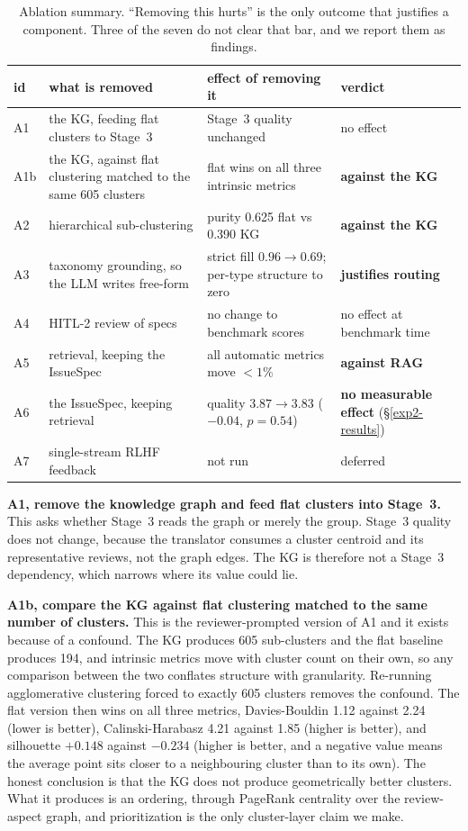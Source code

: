 \documentclass[sigconf, anonymous]{acmart}
\begin{document}
\begin{table}[t]\centering\footnotesize
\caption{Ablation summary. ``Removing this hurts'' is the only outcome that justifies a
component. Three of the seven do not clear that bar, and we report them as findings.}\label{tab:ablation-summary}
\begin{tabular}{@{}p{0.9cm}p{3.6cm}p{3.6cm}p{2.3cm}@{}}\toprule
id & what is removed & effect of removing it & verdict \\\midrule
A1 & the KG, feeding flat clusters to Stage~3 & Stage~3 quality unchanged & no effect \\
A1b & the KG, against flat clustering matched to the same 605 clusters & flat wins on all three intrinsic metrics & \textbf{against the KG} \\
A2 & hierarchical sub-clustering & purity 0.625 flat vs 0.390 KG & \textbf{against the KG} \\
A3 & taxonomy grounding, so the LLM writes free-form & strict fill $0.96 \to 0.69$; per-type structure to zero & \textbf{justifies routing} \\
A4 & HITL-2 review of specs & no change to benchmark scores & no effect at benchmark time \\
A5 & retrieval, keeping the IssueSpec & all automatic metrics move $<1\%$ & \textbf{against RAG} \\
A6 & the IssueSpec, keeping retrieval & quality $3.87 \to 3.83$ ($-0.04$, $p=0.54$) & \textbf{no measurable effect} (\S\ref{exp2-results}) \\
A7 & single-stream RLHF feedback & not run & deferred \\
\bottomrule\end{tabular}\end{table}

  \textbf{A1, remove the knowledge graph and feed flat clusters into Stage~3.} This asks whether
  Stage~3 reads the graph or merely the group. Stage~3 quality does not change, because the
  translator consumes a cluster centroid and its representative reviews, not the graph edges. The
  KG is therefore not a Stage~3 dependency, which narrows where its value could lie.

  \textbf{A1b, compare the KG against flat clustering matched to the same number of clusters.}
  This is the reviewer-prompted version of A1 and it exists because of a confound. The KG
  produces 605 sub-clusters and the flat baseline produces 194, and intrinsic metrics move with
  cluster count on their own, so any comparison between the two conflates structure with
  granularity. Re-running agglomerative clustering forced to exactly 605 clusters removes the
  confound. The flat version then wins on all three metrics, Davies-Bouldin 1.12 against 2.24
  (lower is better), Calinski-Harabasz 4.21 against 1.85 (higher is better), and silhouette
  $+0.148$ against $-0.234$ (higher is better, and a negative value means the average point sits
  closer to a neighbouring cluster than to its own). The honest conclusion is that the KG does
  not produce geometrically better clusters. What it produces is an ordering, through PageRank
  centrality over the review-aspect graph, and prioritization is the only cluster-layer claim we
  make.
\end{document}
